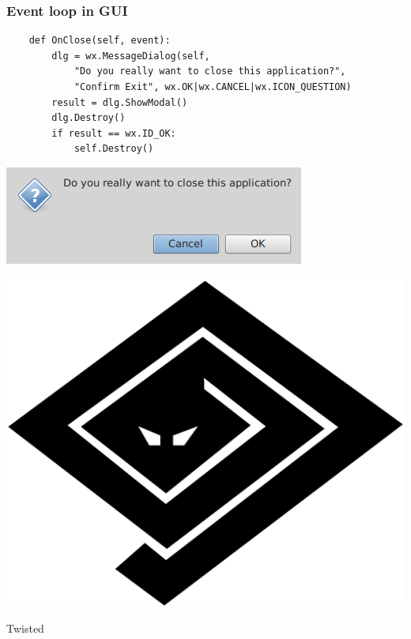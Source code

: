 \documentclass[aspectratio=169]{beamer}
\begin{document}
\begin{frame}[fragile]
  \frametitle{Event loop in GUI}
  \begin{lstlisting}
    def OnClose(self, event):
        dlg = wx.MessageDialog(self,
            "Do you really want to close this application?",
            "Confirm Exit", wx.OK|wx.CANCEL|wx.ICON_QUESTION)
        result = dlg.ShowModal()
        dlg.Destroy()
        if result == wx.ID_OK:
            self.Destroy()
  \end{lstlisting}
  \begin{center}
    \includegraphics[scale=0.5]{img/part3_dialog.png}
  \end{center}
\end{frame}


\begin{frame}
  \begin{center}\includegraphics[scale=0.15]{img/TwistedLogo.eps}\end{center}
  \begin{center}{\Huge Twisted}\end{center}
\end{frame}
\end{document}
